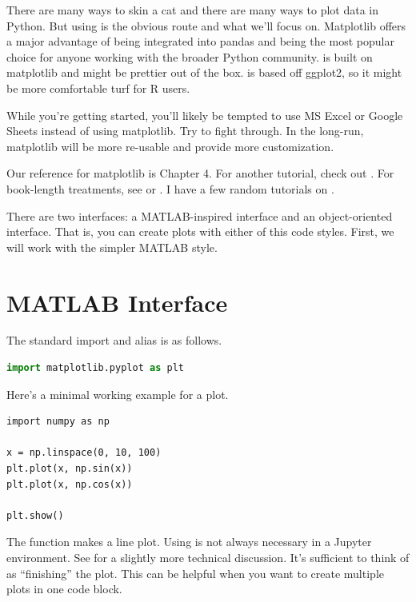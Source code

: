 There are many ways to skin a cat and there are many ways to plot data in Python. But using  is the obvious route and what we'll focus on. Matplotlib offers a major advantage of being integrated into pandas and being the most popular choice for anyone working with the broader Python community.  is built on matplotlib and might be prettier out of the box.  is based off ggplot2, so it might be more comfortable turf for R users. 

While you're getting started, you'll likely be tempted to use MS Excel or Google Sheets instead of using matplotlib. Try to fight through. In the long-run, matplotlib will be more re-usable and provide more customization. 


Our reference for matplotlib is \cite{vanderplas2016python} Chapter 4. For another tutorial, check out . For book-length treatments, see \cite{rougier2021scientific} or \cite{clark2022story}. I have a few random tutorials on . 


There are two interfaces: a MATLAB-inspired interface and an object-oriented interface. That is, you can create plots with either of this code styles. First, we will work with the simpler MATLAB style. 

\section{MATLAB Interface}

The standard import and alias is as follows.

\begin{lstlisting}[language = Python]
import matplotlib.pyplot as plt
\end{lstlisting}

Here's a minimal working example for a plot.

\begin{lstlisting}
import numpy as np

x = np.linspace(0, 10, 100)
plt.plot(x, np.sin(x))
plt.plot(x, np.cos(x))

plt.show()
\end{lstlisting}

The  function makes a line plot. Using  is not always necessary in a Jupyter environment. See  for a slightly more technical discussion. It's sufficient to think of  as ``finishing'' the plot. This can be helpful when you want to create multiple plots in one code block.

